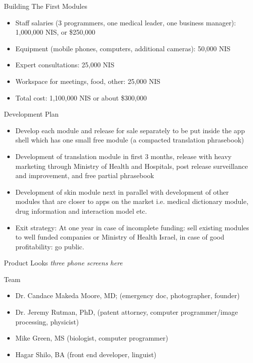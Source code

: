 \documentclass[presentation]{beamer}
\begin{document}
\begin{frame}[label=sec-1-0-4]{Building The First Modules}
\begin{itemize}
\item Staff salaries (3 programmers, one medical leader, one business
manager): 1,000,000 NIS, or \$250,000
\item Equipment (mobile phones, computers, additional cameras): 50,000 NIS
\item Expert consultations: 25,000 NIS
\item Workspace for meetings, food, other: 25,000 NIS
\item Total cost: 1,100,000 NIS or about \$300,000
\end{itemize}
\end{frame}

\begin{frame}[label=sec-1-0-5]{Development Plan}
\begin{itemize}
\item Develop each module and release for sale separately to be put inside
the app shell which has one small free module (a compacted
translation phrasebook)
\item Development of translation module in first 3 months, release with
heavy marketing through Ministry of Health and Hospitals, post
release surveillance and improvement, and free partial phrasebook
\item Development of skin module next in parallel with development of
other modules that are closer to apps on the market i.e. medical
dictionary module, drug information and interaction model etc.
\item Exit strategy: At one year in case of incomplete funding: sell
existing modules to well funded companies or Ministry of Health
Israel, in case of good profitability: go public.
\end{itemize}
\end{frame}

\begin{frame}[label=sec-1-0-6]{Product Looks}
\emph{three phone screens here}
\end{frame}

\begin{frame}[label=sec-1-0-7]{Team}
\begin{itemize}
\item Dr. Candace Makeda Moore, MD; (emergency doc, photographer, founder)
\item Dr. Jeremy Rutman, PhD, (patent attorney, computer programmer/image
processing, physicist)
\item Mike Green, MS (biologist, computer programmer)
\item Hagar Shilo, BA (front end developer, linguist)
\end{itemize}
\end{frame}
\end{document}
